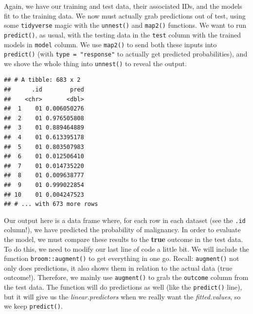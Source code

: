 \documentclass[]{article}
\newenvironment{Shaded}{\begin{snugshade}}{\end{snugshade}}
\newcommand{\KeywordTok}[1]{\textcolor[rgb]{0.13,0.29,0.53}{\textbf{#1}}}
\newcommand{\DataTypeTok}[1]{\textcolor[rgb]{0.13,0.29,0.53}{#1}}
\newcommand{\StringTok}[1]{\textcolor[rgb]{0.31,0.60,0.02}{#1}}
\newcommand{\OperatorTok}[1]{\textcolor[rgb]{0.81,0.36,0.00}{\textbf{#1}}}
\newcommand{\NormalTok}[1]{#1}
\begin{document}
Again, we have our training and test data, their associated IDs, and the
models fit to the training data. We now must actually grab predictions
out of test, using some \texttt{tidyverse} magic with the
\texttt{unnest()} and \texttt{map2()} functions. We want to run
\texttt{predict()}, as usual, with the testing data in the \texttt{test}
column with the trained models in \texttt{model} column. We use
\texttt{map2()} to send both these inputs into \texttt{predict()} (with
\texttt{type\ =\ "response"} to actually get predicted probabilities),
and we shove the whole thing into \texttt{unnest()} to reveal the
output.

\begin{Shaded}
\end{Shaded}

\begin{verbatim}
## # A tibble: 683 x 2
##      .id        pred
##    <chr>       <dbl>
##  1    01 0.006050276
##  2    01 0.976505808
##  3    01 0.889464889
##  4    01 0.613395178
##  5    01 0.803507983
##  6    01 0.012506410
##  7    01 0.014735220
##  8    01 0.009638777
##  9    01 0.999022854
## 10    01 0.004247523
## # ... with 673 more rows
\end{verbatim}

Our output here is a data frame where, for each row in each dataset (see
the \texttt{.id} column!), we have predicted the probability of
malignancy. In order to evaluate the model, we must compare these
results to the \textbf{true} outcome in the test data. To do this, we
need to modify our last line of code a little bit. We will include the
function \texttt{broom::augment()} to get everything in one go. Recall:
\texttt{augment()} not only does predictions, it also shows them in
relation to the actual data (true outcome!). Therefore, we mainly use
\texttt{augment()} to grab the \texttt{outcome} column from the test
data. The function will do predictions as well (like the
\texttt{predict()} line), but it will give us the
\emph{linear.predictors} when we really want the \emph{fitted.values},
so we keep \texttt{predict()}.
\end{document}
